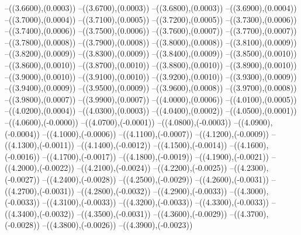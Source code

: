 {	--({\sx*(3.6600)},{\sy*(0.0003)})
	--({\sx*(3.6700)},{\sy*(0.0003)})
	--({\sx*(3.6800)},{\sy*(0.0003)})
	--({\sx*(3.6900)},{\sy*(0.0004)})
	--({\sx*(3.7000)},{\sy*(0.0004)})
	--({\sx*(3.7100)},{\sy*(0.0005)})
	--({\sx*(3.7200)},{\sy*(0.0005)})
	--({\sx*(3.7300)},{\sy*(0.0006)})
	--({\sx*(3.7400)},{\sy*(0.0006)})
	--({\sx*(3.7500)},{\sy*(0.0006)})
	--({\sx*(3.7600)},{\sy*(0.0007)})
	--({\sx*(3.7700)},{\sy*(0.0007)})
	--({\sx*(3.7800)},{\sy*(0.0008)})
	--({\sx*(3.7900)},{\sy*(0.0008)})
	--({\sx*(3.8000)},{\sy*(0.0008)})
	--({\sx*(3.8100)},{\sy*(0.0009)})
	--({\sx*(3.8200)},{\sy*(0.0009)})
	--({\sx*(3.8300)},{\sy*(0.0009)})
	--({\sx*(3.8400)},{\sy*(0.0009)})
	--({\sx*(3.8500)},{\sy*(0.0010)})
	--({\sx*(3.8600)},{\sy*(0.0010)})
	--({\sx*(3.8700)},{\sy*(0.0010)})
	--({\sx*(3.8800)},{\sy*(0.0010)})
	--({\sx*(3.8900)},{\sy*(0.0010)})
	--({\sx*(3.9000)},{\sy*(0.0010)})
	--({\sx*(3.9100)},{\sy*(0.0010)})
	--({\sx*(3.9200)},{\sy*(0.0010)})
	--({\sx*(3.9300)},{\sy*(0.0009)})
	--({\sx*(3.9400)},{\sy*(0.0009)})
	--({\sx*(3.9500)},{\sy*(0.0009)})
	--({\sx*(3.9600)},{\sy*(0.0008)})
	--({\sx*(3.9700)},{\sy*(0.0008)})
	--({\sx*(3.9800)},{\sy*(0.0007)})
	--({\sx*(3.9900)},{\sy*(0.0007)})
	--({\sx*(4.0000)},{\sy*(0.0006)})
	--({\sx*(4.0100)},{\sy*(0.0005)})
	--({\sx*(4.0200)},{\sy*(0.0004)})
	--({\sx*(4.0300)},{\sy*(0.0003)})
	--({\sx*(4.0400)},{\sy*(0.0002)})
	--({\sx*(4.0500)},{\sy*(0.0001)})
	--({\sx*(4.0600)},{\sy*(-0.0000)})
	--({\sx*(4.0700)},{\sy*(-0.0001)})
	--({\sx*(4.0800)},{\sy*(-0.0003)})
	--({\sx*(4.0900)},{\sy*(-0.0004)})
	--({\sx*(4.1000)},{\sy*(-0.0006)})
	--({\sx*(4.1100)},{\sy*(-0.0007)})
	--({\sx*(4.1200)},{\sy*(-0.0009)})
	--({\sx*(4.1300)},{\sy*(-0.0011)})
	--({\sx*(4.1400)},{\sy*(-0.0012)})
	--({\sx*(4.1500)},{\sy*(-0.0014)})
	--({\sx*(4.1600)},{\sy*(-0.0016)})
	--({\sx*(4.1700)},{\sy*(-0.0017)})
	--({\sx*(4.1800)},{\sy*(-0.0019)})
	--({\sx*(4.1900)},{\sy*(-0.0021)})
	--({\sx*(4.2000)},{\sy*(-0.0022)})
	--({\sx*(4.2100)},{\sy*(-0.0024)})
	--({\sx*(4.2200)},{\sy*(-0.0025)})
	--({\sx*(4.2300)},{\sy*(-0.0027)})
	--({\sx*(4.2400)},{\sy*(-0.0028)})
	--({\sx*(4.2500)},{\sy*(-0.0029)})
	--({\sx*(4.2600)},{\sy*(-0.0031)})
	--({\sx*(4.2700)},{\sy*(-0.0031)})
	--({\sx*(4.2800)},{\sy*(-0.0032)})
	--({\sx*(4.2900)},{\sy*(-0.0033)})
	--({\sx*(4.3000)},{\sy*(-0.0033)})
	--({\sx*(4.3100)},{\sy*(-0.0033)})
	--({\sx*(4.3200)},{\sy*(-0.0033)})
	--({\sx*(4.3300)},{\sy*(-0.0033)})
	--({\sx*(4.3400)},{\sy*(-0.0032)})
	--({\sx*(4.3500)},{\sy*(-0.0031)})
	--({\sx*(4.3600)},{\sy*(-0.0029)})
	--({\sx*(4.3700)},{\sy*(-0.0028)})
	--({\sx*(4.3800)},{\sy*(-0.0026)})
	--({\sx*(4.3900)},{\sy*(-0.0023)})
}
